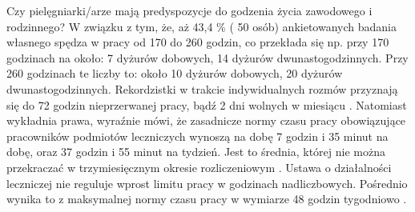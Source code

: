 \documentclass[a4paper,12pt,twoside,openany]{report}
\begin{document}
Czy  pielęgniarki/arze mają predyspozycje do godzenia życia zawodowego i rodzinnego? W związku z tym, że, aż 43,4 \%  ( 50 osób) ankietowanych badania własnego spędza w pracy od 170 do 260 godzin, co przekłada się np. przy 170 godzinach na około:  7 dyżurów dobowych, 14 dyżurów dwunastogodzinnych. Przy 260 godzinach te liczby to: około  10 dyżurów dobowych, 20 dyżurów dwunastogodzinnych. Rekordzistki w trakcie indywidualnych rozmów przyznają się do 72 godzin nieprzerwanej pracy, bądź 2 dni wolnych w miesiącu \cite{cyfrowe}. Natomiast wykładnia prawa, wyraźnie mówi, że zasadnicze normy czasu pracy obowiązujące pracowników podmiotów leczniczych wynoszą na dobę 7 godzin i 35 minut na dobę, oraz 37 godzin i 55 minut na tydzień. Jest to średnia, której nie można przekraczać w trzymiesięcznym okresie rozliczeniowym \cite{okres}. Ustawa o działalności leczniczej nie reguluje wprost limitu pracy w godzinach nadliczbowych. Pośrednio wynika to z maksymalnej normy czasu pracy w wymiarze 48 godzin tygodniowo \cite{klauzula}.
\end{document}

